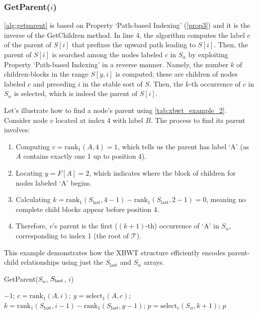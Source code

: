 \subsubsection*{GetParent($i$)}
\cref{alg:getparent} is based on Property `Path-based Indexing' (\cref{prop3}) and it is the inverse of the GetChildren method. In line 4, the algorithm computes the label $c$ of the parent of $S[i]$ that prefixes the upward path leading to $S[i]$. Then, the parent of $S[i]$ is searched among the nodes labeled $c$ in $S_{\alpha}$ by exploiting Property `Path-based Indexing' in a reverse manner. Namely, the number $k$ of children-blocks in the range $S[y, i]$ is computed; these are children of nodes labeled $c$ and preceding $i$ in the stable sort of $S$. Then, the $k$-th occurrence of $c$ in $S_{\alpha}$ is selected, which is indeed the parent of $S[i]$.

\begin{example}
    Let's illustrate how to find a node's parent using \cref{tab:xbwt_example_2}. Consider node $v$ located at index 4 with label $B$. The process to find its parent involves:
    \begin{enumerate}
        \item Computing $c = \text{rank}_1(A, 4) = 1$, which tells us the parent has label `A' (as $A$ contains exactly one 1 up to position 4).
        \item Locating $y = F[A] = 2$, which indicates where the block of children for nodes labeled `A' begins.
        \item Calculating $k = \text{rank}_1(S_{\text{last}}, 4-1) - \text{rank}_1(S_{\text{last}}, 2-1) = 0$, meaning no complete child blocks appear before position 4.
        \item Therefore, $v$'s parent is the first ($(k+1)$-th) occurrence of `A' in $S_{\alpha}$, corresponding to index 1 (the root of $\mathcal{T}$).
    \end{enumerate}
    This example demonstrates how the XBWT structure efficiently encodes parent-child relationships using just the $S_{\text{last}}$ and $S_{\alpha}$ arrays.
\end{example}

\begin{algorithm}[H]
    \caption{GetParent($S_\alpha$, $S_{\textup{last}}$, $i$)}
    \label{alg:getparent}
    \begin{algorithmic}[1]
        \State \Return $-1$; 
    \EndIf
    \State $c = \text{rank}_1(A, i)$;
    \State $y = \text{select}_1(A, c)$;
    \State $k = \text{rank}_1(S_{\text{last}}, i - 1) - \text{rank}_1(S_{\text{last}}, y - 1)$;
    \State $p = \text{select}_c(S_\alpha, k + 1)$;
    \State \Return $p$
    \end{algorithmic}
\end{algorithm}

